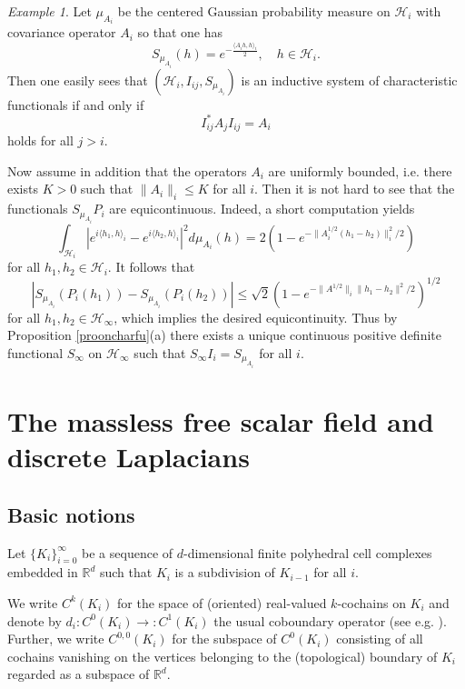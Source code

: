 \documentclass[11pt,reqno]{amsart}
\numberwithin{equation}{section}
\theoremstyle{remark}
\newtheorem{example}[theorem]{Example}
\theoremstyle{rmdefinition}
\begin{document}
\begin{example}\label{gaumesexam}
Let $\mu_{A_i}$ be the centered Gaussian probability measure on $\mathcal{H}_i$ with covariance operator $A_i$ so that one has 
$$ S_{\mu_{A_i}}(h)=e^{-\frac{\langle A_i h, h\rangle_i}{2}}, 
	\quad h \in \mathcal{H}_i.$$
Then one easily sees that $(\mathcal{H}_i,I_{ij},S_{\mu_{A_i}})$ is an inductive system of characteristic functionals if and only if 
\begin{equation}\label{consgaucova}
I_{ij}^{*} A_j I_{ij}=A_i
\end{equation}
holds for all $j>i$.

Now assume in addition that the operators $A_i$ are uniformly bounded, i.e. there exists $K>0$ such that $\|A_i \|_i \leq K $ for all $i$. Then it is not hard to see that the functionals $S_{\mu_{A_i}}P_i$ are equicontinuous. Indeed, a short computation yields
$$ \int_{\mathcal{H}_i}|e^{i\langle h_1, h \rangle_{i}}
-e^{i\langle h_2, h \rangle_{i}} |^2 d\mu_{A_i}(h)=
2(1-e^{-\|A^{1/2}_{i}(h_1-h_2)\|_{i}^{2}/2})$$
for all $h_1,h_2 \in \mathcal{H}_i$. It follows that 
$$| S_{\mu_{A_i}}(P_i(h_1))-S_{\mu_{A_i}}(P_i(h_2))| \leq 
\sqrt{2}(1-e^{-\|A^{1/2}\|_{i}\|h_1-h_2\|^{2}/2})^{1/2}$$
for all $h_1,h_2 \in \mathcal{H}_{\infty}$, which implies the desired equicontinuity. Thus by Proposition \ref{prooncharfu}(a) there exists a unique continuous positive definite functional $S_{\infty}$ on $\mathcal{H}_{\infty}$ such that $S_{\infty}I_i=S_{\mu_{A_i}}$ for all $i$.
\end{example}

\section{The massless free scalar field and discrete Laplacians}\label{onedimsec}

\subsection{Basic notions} 

Let $\{K_i\}_{i=0}^{\infty}$ be a sequence of $d$-dimensional finite polyhedral cell complexes embedded in $\mathbb{R}^d$ such that $K_i$ is a subdivision of $K_{i-1}$ for all $i$. 

We write $C^{k}(K_i)$ for the space of (oriented) real-valued $k$-cochains on $K_i$ and denote by $d_i:C^{0}(K_i) \rightarrow :C^{1}(K_i)$ the usual coboundary operator (see e.g. \cite[\S 42]{Mu}). Further, we write  $C^{0,0}(K_i)$ for the subspace of $C^{0}(K_i)$ consisting of all cochains vanishing on the vertices belonging to the (topological) boundary of $K_i$ regarded as a subspace of $\mathbb{R}^d$.
\end{document}
